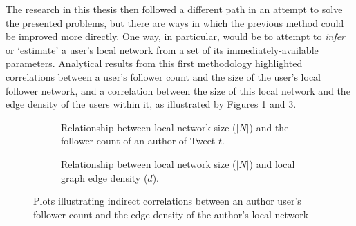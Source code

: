 The research in this thesis then followed a different path in an attempt to solve the presented problems, but there are ways in which the previous method could be improved more directly. One way, in particular, would be to attempt to \textit{infer} or `estimate' a user's local network from a set of its immediately-available parameters. Analytical results from this first methodology highlighted correlations between a user's follower count and the size of the user's local follower network, and a correlation between the size of this local network and the edge density of the users within it, as illustrated by Figures \ref{fig:network-followers} and \ref{fig:network-density}.

\begin{figure}[h]
\begin{subfigure}{.5\textwidth}
    \centering
    \caption{Relationship between local network size ($|N|$) and the follower count of an author of Tweet $t$.}
    \label{fig:network-followers}
\end{subfigure}
\quad
\begin{subfigure}{.5\textwidth}
    \centering
    \caption{Relationship between local network size ($|N|$) and local graph edge density ($d$).}
    \label{fig:network-density}
\end{subfigure}
\caption{Plots illustrating indirect correlations between an author user's follower count and the edge density of the author's local network}
\end{figure}

